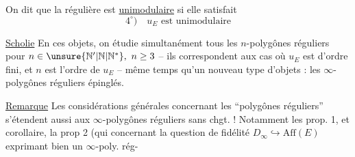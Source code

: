 

On dit que la  régulière est \uline{unimodulaire} si elle satisfait
\[
4^\circ)\quad u_E \text{ est unimodulaire}
\]

\uline{Scholie} En  ces objets, on étudie simultanément tous les $n$-polygônes réguliers  pour $n\in\unsure{\mathbb N'|\mathbb N|\mathbb N^{*}},\ n\geq 3$ -- ils correspondent aux cas où $u_E$ est d'ordre fini, et $n$ est l'ordre de $u_E$ --  même temps qu'un nouveau type d'objets : les $\infty$-polygônes réguliers épinglés.

\uline{Remarque} Les considérations générales concernant les ``polygônes réguliers'' s'étendent aussi aux $\infty$-polygônes réguliers sans chgt. ! Notamment les prop. 1, et corollaire, la prop 2 (qui  concernant la  question de fidélité $D_\infty\hookrightarrow\mathrm{Aff}(E)$ exprimant    bien un $\infty$-poly. rég-
